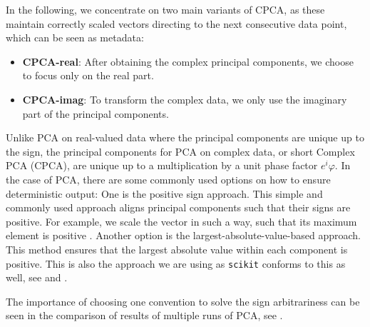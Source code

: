 \documentclass[pdftex,12pt,a4paper]{report}
\begin{document}
In the following, we concentrate on two main variants of CPCA, as these maintain correctly scaled vectors directing to the next consecutive data point, which can be seen as metadata:
\begin{itemize}
    \item[] \textbf{CPCA-real}: After obtaining the complex principal components, we choose to focus only on the real part.
    \item[] \textbf{CPCA-imag}: To transform the complex data, we only use the imaginary part of the principal components.
\end{itemize}


Unlike PCA on real-valued data where the principal components are unique up to the sign, the principal components for PCA on complex data, or short Complex PCA (CPCA), are unique up to a multiplication by a unit phase factor $e^i\varphi$.
In the case of PCA, there are some commonly used options on how to ensure deterministic output:
One is the positive sign approach.
This simple and commonly used approach aligns principal components such that their signs are positive.
For example, we scale the vector in such a way, such that its maximum element is positive \cite{sign-flip}.
Another option is the largest-absolute-value-based approach.
This method ensures that the largest absolute value within each component is positive. This is also the approach we are using as \texttt{scikit} conforms to this as well, see \cite{sign-flip} and \cite{website-pca}.

The importance of choosing one convention to solve the sign arbitrariness can be seen in the comparison of results of multiple runs of PCA, see \cite{sign-flip}.
\end{document}
